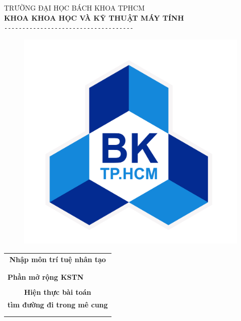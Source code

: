 \documentclass[a4paper]{article}
\author{Lăng Hoàng Long, Hoàng Gia Khang}
\date{Tháng 5, 2020}
\begin{document}
	\begin{titlepage}
		\begin{center}
			\vspace*{2cm}
			\large{TRƯỜNG ĐẠI HỌC BÁCH KHOA TPHCM}\\
			\large{\textbf{KHOA KHOA HỌC VÀ KỸ THUẬT MÁY TÍNH}}\\
			\verb|------------------------------------|\\

			\begin{figure}[H]
				\centering
				\includegraphics[scale=0.3]{Image/BKHCM.png}
			\end{figure}

			\begin{tabular}{c}
				\multicolumn{1}{c}{\textbf{\LARGE{Nhập môn trí tuệ nhân tạo}}}\\
				\\ \hline \\
				\multicolumn{1}{l}{\textbf{\Large{Phần mở rộng KSTN}}}\\
				\\
				\textbf{\Huge{Hiện thực bài toán}}\\
				\textbf{\Huge{tìm đường đi trong mê cung}}\\
				\\ \hline \\
			\end{tabular}


\end{center}
\end{titlepage}
\end{document}
